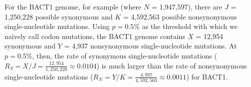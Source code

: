 For the BACT1 genome, for example
(where $N$ = 1,947,597),
there are $J$ = 1,250,228 possible synonymous and
$K$ = 4,592,563 possible nonsynonymous single-nucleotide mutations.
%
Using $p = 0.5\%$ as the threshold with which we na\"ively call codon mutations,
the BACT1 genome contains
$X$ = 12,954 synonymous and
$Y$ = 4,937 nonsynonymous single-nucleotide mutations.
%
At $p = 0.5\%$, then, the rate of synonymous single-nucleotide mutations
($R_S = X / J = \frac{12,954}{1,250,228}
\approx 0.0104$)
is much larger than the rate of nonsynonymous single-nucleotide mutations
($R_N = Y / K = \frac{4,937}{4,592,563}
\approx 0.0011$)
for BACT1.
\endinput